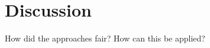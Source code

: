 \documentclass[main.tex]{subfiles}
\begin{document}
\chapter{Discussion}
How did the approaches fair?
How can this be applied?


\end{document}
